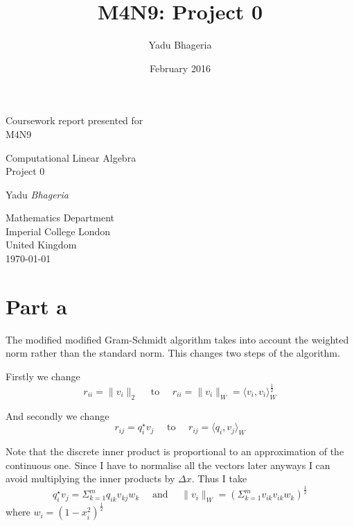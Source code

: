 \documentclass[a4paper,10pt]{article}
\title{M4N9: Project 0}
\author{Yadu Bhageria}
\date{February 2016}
\begin{document}
\begin{titlepage}
    \begin{center}
    
        Coursework report presented for\\
        M4N9
        
        \vfill
        
        {\Huge Computational Linear Algebra\\ Project 0}
        
        
        \vspace{0.5cm}
        
        \vspace{1.5cm}
        
        {\Large Yadu \emph{Bhageria}}
        
        \vfill
        
        Mathematics Department\\
        Imperial College London\\
        United Kingdom\\
        \today
        
    \end{center}
\end{titlepage}

\textbf{ }
\section{Part a}

The modified modified Gram-Schmidt algorithm takes into account the weighted norm rather than the standard norm. This changes two steps of the algorithm. 

Firstly we change $$ r_{ii} = \|v_i\|_2 \quad \text{ to } \quad r_{ii} = \|v_i\|_W = \langle v_i, v_i \rangle_W^{\frac{1}{2}} $$

And secondly we change $$ r_{ij} = q_i^{\star}v_j \quad \text{ to } \quad r_{ij} = \langle q_i, v_j \rangle_W $$

Note that the discrete inner product is proportional to an approximation of the continuous one. Since I have to normalise all the vectors later anyways I can avoid multiplying the inner products by $\Delta x $. Thus I take $$ q_i^\star v_j = \Sigma_{k=1}^m q_{ik} v_{kj} w_k \quad \text{ and } \quad \|v_i\|_W = (\Sigma_{k=1}^m v_{ik} v_{ik} w_k)^{\frac{1}{2}} $$
where $ w_i = (1-x_i^2)^{\frac{1}{2}} $\\
\end{document}
